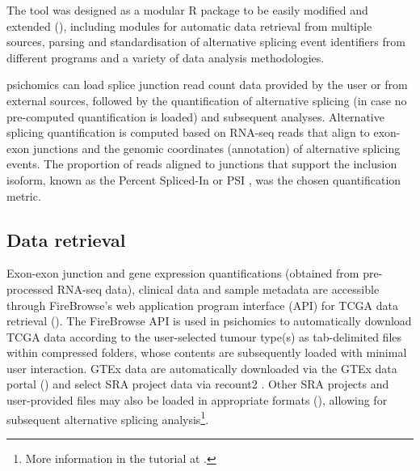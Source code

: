 The tool was designed as a modular R package to be easily modified and extended (), including modules for automatic data retrieval from multiple sources, parsing and standardisation of alternative splicing event identifiers from different programs and a variety of data analysis methodologies.

psichomics can load splice junction read count data provided by the user or from external sources, followed by the quantification of alternative splicing (in case no pre-computed quantification is loaded) and subsequent analyses. Alternative splicing quantification is computed based on RNA-seq reads that align to exon-exon junctions and the genomic coordinates (annotation) of alternative splicing events. The proportion of reads aligned to junctions that support the inclusion isoform, known as the Percent Spliced-In or PSI \cite{wang:2008wa}, was the chosen quantification metric.

\subsection{Data retrieval}

Exon-exon junction and gene expression quantifications (obtained from pre-processed RNA-seq data), clinical data and sample metadata are accessible through FireBrowse's web application program interface (API) for TCGA data retrieval (). The FireBrowse API is used in psichomics to automatically download TCGA data according to the user-selected tumour type(s) as tab-delimited files within compressed folders, whose contents are subsequently loaded with minimal user interaction. GTEx data are automatically downloaded via the GTEx data portal () and select SRA project data via recount2 \cite{collado-torres:2017uw}. Other SRA projects and user-provided files may also be loaded in appropriate formats (), allowing for subsequent alternative splicing analysis\footnote{More information in the tutorial at .}.

